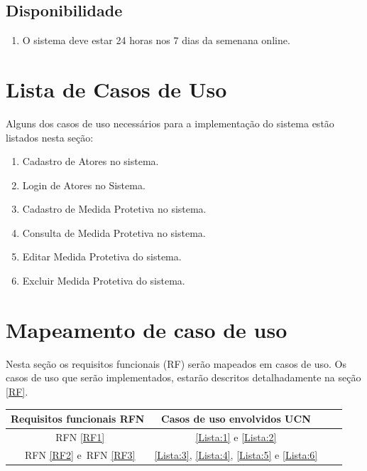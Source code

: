 \documentclass[
	12pt,				%
    oneside,			%
	a4paper,			%
	english,			%
	french,				%
	spanish,			%
	brazil,				%
	]{abntex2}
\begin{document}
		\subsection{Disponibilidade}
			\begin{enumerate}
				\item O sistema deve estar 24 horas nos 7 dias da semenana online.
			\end{enumerate}
	\section{Lista de Casos de Uso}
		Alguns dos casos de uso necessários para a implementação do sistema estão listados nesta seção:
		\begin{enumerate}
			\item Cadastro de Atores no sistema. \label{Lista:1}
			\item Login de Atores no Sistema.\label{Lista:2}
			\item Cadastro de Medida Protetiva no sistema.\label{Lista:3}
			\item Consulta de Medida Protetiva no sistema.\label{Lista:4}
			\item Editar Medida Protetiva do sistema.\label{Lista:5}
			\item Excluir Medida Protetiva do sistema.\label{Lista:6}
		\end{enumerate}
	\section{Mapeamento de caso de uso}
		 Nesta seção os requisitos funcionais (RF) serão mapeados em casos de uso. Os casos de uso que serão implementados, estarão descritos detalhadamente na seção \ref{RF}.

		\begin{center}
			\begin{tabular}{ |c|c|c|c| } 
				\hline
				Requisitos funcionais
				RFN  & Casos de uso envolvidos
				UCN \\
				\hline
				~RFN \ref{RF1} & \ref{Lista:1} e \ref{Lista:2} \\ 
				\hline
				~RFN \ref{RF2}  e~RFN  \ref{RF3} & \ref{Lista:3}, \ref{Lista:4}, \ref{Lista:5} e \ref{Lista:6}   \\ 
				\hline
			
			\end{tabular}
		\end{center}
	
\end{document}
